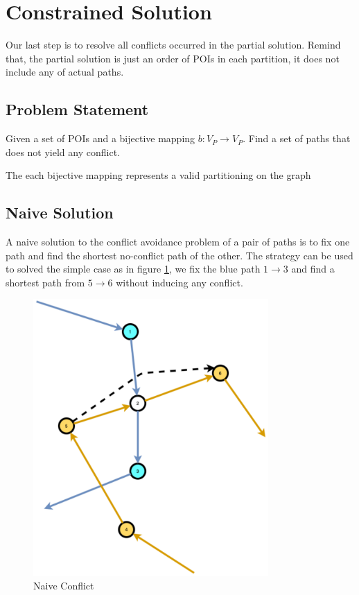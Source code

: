 \section{Constrained Solution}

Our last step is to resolve all conflicts occurred in the partial solution. Remind that, the partial solution is just an order of POIs in each partition, it does not include any of actual paths.

\subsection{Problem Statement}

\begin{problem}
Given a set of POIs and a bijective mapping $b: V_P \to V_P$. Find a set of paths that does not yield any conflict.
\label{prob:conflict}
\end{problem}

The each bijective mapping represents a valid partitioning on the graph

\subsection{Naive Solution}

A naive solution to the conflict avoidance problem of a pair of paths is to fix one path and find the shortest no-conflict path of the other. The strategy can be used to solved the simple case as in figure \ref{fig:naive_conflict}, we fix the blue path $1 \to 3$ and find a shortest path from $5 \to 6$ without inducing any conflict.

\begin{figure}[h!]
\centering
\includegraphics[width=0.8\textwidth]{assets/naive_conflict.png}
\caption{Naive Conflict}
\label{fig:naive_conflict}
\end{figure}

